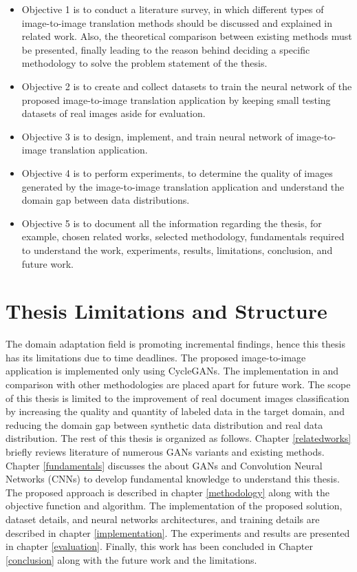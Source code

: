 \begin{itemize}[label=\EightFlowerPetalRemoved]
  \item Objective 1 is to conduct a literature survey, in which different types of image-to-image translation methods should be discussed and explained in related work. Also, the theoretical comparison between existing methods must be presented, finally leading to the reason behind deciding a specific methodology to solve the problem statement of the thesis.
\item Objective 2 is to create and collect datasets to train the neural network of the proposed image-to-image translation application by keeping small testing datasets of real images aside for evaluation.
\item Objective 3 is to design, implement, and train neural network of image-to-image translation application.
\item Objective 4 is to perform experiments, to determine the quality of images generated by the image-to-image translation application and understand the domain gap between data distributions.
\item Objective 5 is to document all the information regarding the thesis, for example, chosen related works, selected methodology, fundamentals required to understand the work, experiments, results, limitations, conclusion, and future work.
\end{itemize}


\section{Thesis Limitations and Structure}\label{thesisstructurelimitations}
The domain adaptation field is promoting incremental findings, hence this thesis has its limitations due to time deadlines. The proposed image-to-image application is implemented only using \acp{CycleGAN}. The implementation in and comparison with other methodologies are placed apart for future work. The scope of this thesis is limited to the improvement of real document images classification by increasing the quality and quantity of labeled data in the target domain, and reducing the domain gap between synthetic data distribution and real data distribution. The rest of this thesis is organized as follows. Chapter \ref{relatedworks} briefly reviews literature of numerous \acp{GAN} variants and existing methods. Chapter \ref{fundamentals} discusses the about \acp{GAN} and Convolution Neural Networks (CNNs) to develop fundamental knowledge to understand this thesis. The proposed approach is described in chapter \ref{methodology} along with the objective function and algorithm. The implementation of the proposed solution, dataset details, and neural networks architectures, and training details are described in chapter \ref{implementation}. The experiments and results are presented in chapter \ref{evaluation}. Finally, this work has been concluded in Chapter \ref{conclusion} along with the future work and the limitations.


